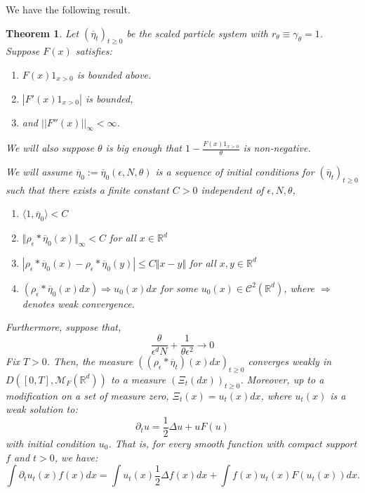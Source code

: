 \documentclass[12pt]{article}
\newtheorem{theorem}{Theorem}[section]
\begin{document}
We have the following result.

\begin{theorem} \label{TeoremOneStepConvergence}
Let $(\overline{\eta}_t)_{t \geq 0}$ be the scaled particle system with $r_\theta \equiv \gamma_\theta = 1$. Suppose $F(x)$ satisfies:
\begin{enumerate}
    \item $F(x)1_{x>0}$  is bounded above.
    \item $|F'(x)1_{x>0}|$ is bounded,
    \item and $||F''(x)||_\infty < \infty$.
\end{enumerate}
We will also suppose $\theta$ is big enough that $1- \frac{F(x)1_{x>0}}{\theta}$ is non-negative.

We will assume $\overline{\eta}_0:=\overline{\eta}_0(\epsilon,N,\theta)$ is a sequence of initial conditions for $(\overline{\eta}_t)_{t \geq 0}$ such that there exists a finite constant $C>0$ independent of $\epsilon, N, \theta$, 
\begin{enumerate}
\item $\langle 1 , \overline{\eta}_0 \rangle < C $
\item  $\Vert \rho_\epsilon * \overline{\eta}_0(x) \Vert_\infty < C$ for all $x \in \mathbb{R}^d$
\item $|\rho_\epsilon * \overline{\eta}_0(x) - \rho_\epsilon * \overline{\eta}_0(y)| \leq C \Vert x - y \Vert  $ for all $x,y \in \mathbb{R}^d$
\item $(\rho_\epsilon * \overline{\eta}_0(x) dx) \Rightarrow u_0(x)dx$ for some $u_0(x) \in \mathcal{C}^2(\mathbb{R}^d)$, where $\Rightarrow$ denotes weak convergence. 
\end{enumerate}
Furthermore, suppose that,
\begin{equation}
\frac{\theta}{\epsilon^d N} + \frac{1}{\theta \epsilon^{2}}\rightarrow 0 \label{ConditionsForConvergence}
\end{equation}
Fix $T>0$. Then, the measure $((\rho_\epsilon *\overline{\eta}_t)(x) dx)_{t \geq 0}$ converges weakly in $D([0,T], \mathcal{M}_F(\mathbb{R}^d))$ to a measure $(\Xi_t(dx))_{t \geq 0}$. Moreover, up to a modification on a set of measure zero, $\Xi_t(x) = u_t(x)dx$, where $u_t(x)$ is a weak solution to:
\[ \partial_t u = \frac{1}{2}\Delta u + u F(u) \]
with initial condition $u_0$. That is, for every smooth function with compact support $f$ and $t>0$, we have:
\begin{equation*}
 \int \partial_t  u_t(x) f(x) dx = \int u_t(x)\frac{1}{2} \Delta f(x) dx + \int f(x) u_t(x) F(u_t(x)) dx.
\end{equation*}
\end{theorem}
\end{document}
